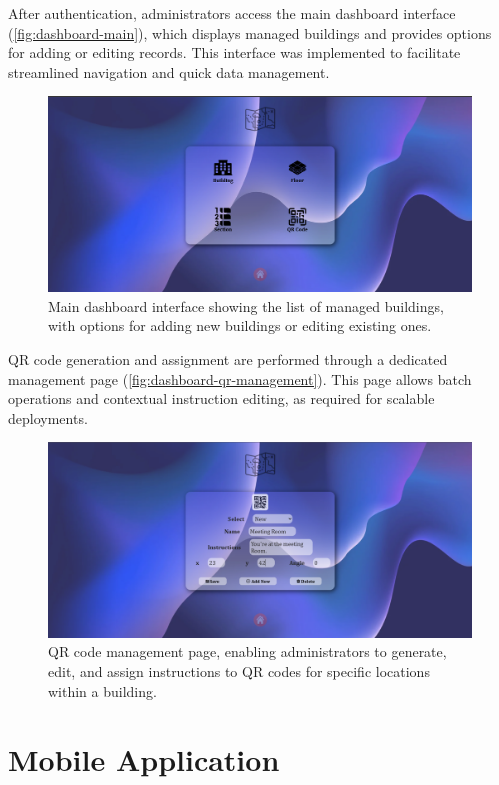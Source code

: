 After authentication, administrators access the main dashboard interface (\autoref{fig:dashboard-main}), which displays managed buildings and provides options for adding or editing records. This interface was implemented to facilitate streamlined navigation and quick data management.
\begin{figure}[h]
	\centering
	\includegraphics[width=1\textwidth]{assets/ch5_imp/Manage_dashboard}
	\caption{Main dashboard interface showing the list of managed buildings, with options for adding new buildings or editing existing ones.}
	\label{fig:dashboard-main}
\end{figure}

QR code generation and assignment are performed through a dedicated management page (\autoref{fig:dashboard-qr-management}). This page allows batch operations and contextual instruction editing, as required for scalable deployments.
\begin{figure}[h]
	\centering
	\includegraphics[width=1\textwidth]{assets/ch5_imp/manage_qr}
	\caption{QR code management page, enabling administrators to generate, edit, and assign instructions to QR codes for specific locations within a building.}
	\label{fig:dashboard-qr-management}
\end{figure}

\section{Mobile Application}

